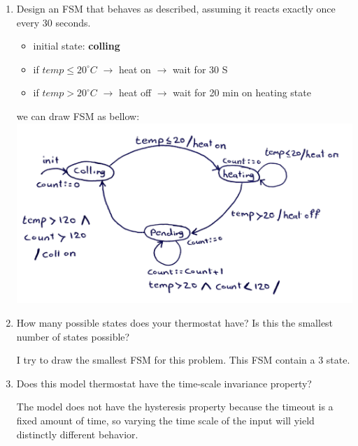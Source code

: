 \documentclass[12pt]{article}
\begin{document}
\begin{enumerate}
	\item Design an FSM that behaves as described, assuming it reacts exactly once
	every 30 seconds.
	\begin{qsolve}[Solution]
		\begin{itemize}
			\item initial state: \textbf{colling}
			\item if $temp \le 20^{\circ} C$ $\rightarrow$ heat on $\rightarrow$ wait for 30 S
			\item if $temp > 20^{\circ} C$ $\rightarrow$ heat off $\rightarrow$ wait for 20 min on heating state
		\end{itemize}
		
	we can draw FSM as bellow:\\
	
	\centering\includegraphics*[width=0.8\linewidth]{images/img7}
	\end{qsolve}
	
	
	
	\item How many possible states does your thermostat have? Is this the smallest
	number of states possible?
	\begin{qsolve}[Solution]
		I try to draw the smallest FSM for this problem. This FSM contain a 3 state.
	\end{qsolve}
	
	
	
	
	\item Does this model thermostat have the time-scale invariance property?
	\begin{qsolve}[Solution]
		The model does not have the hysteresis property because the timeout is a ﬁxed amount
		of time, so varying the time scale of the input will yield distinctly different behavior.
	\end{qsolve}
\end{enumerate}
\end{document}
